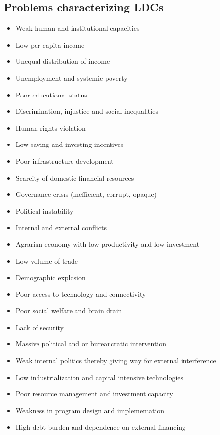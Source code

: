 \documentclass[
  openany]{book}
\providecommand{\tightlist}{%
  \setlength{\itemsep}{0pt}\setlength{\parskip}{0pt}}
\begin{document}
\hypertarget{problems-characterizing-ldcs}{%
\subsection{Problems characterizing LDCs}\label{problems-characterizing-ldcs}}

\begin{itemize}
\tightlist
\item
  Weak human and institutional capacities
\item
  Low per capita income
\item
  Unequal distribution of income
\item
  Unemployment and systemic poverty
\item
  Poor educational status
\item
  Discrimination, injustice and social inequalities
\item
  Human rights violation
\item
  Low saving and investing incentives
\item
  Poor infrastructure development
\item
  Scarcity of domestic financial resources
\item
  Governance crisis (inefficient, corrupt, opaque)
\item
  Political instability
\item
  Internal and external conflicts
\item
  Agrarian economy with low productivity and low investment
\item
  Low volume of trade
\item
  Demographic explosion
\item
  Poor access to technology and connectivity
\item
  Poor social welfare and brain drain
\item
  Lack of security
\item
  Massive political and or bureaucratic intervention
\item
  Weak internal politics thereby giving way for external interference
\item
  Low industrialization and capital intensive technologies
\item
  Poor resource management and investment capacity
\item
  Weakness in program design and implementation
\item
  High debt burden and dependence on external financing
\end{itemize}
\end{document}
